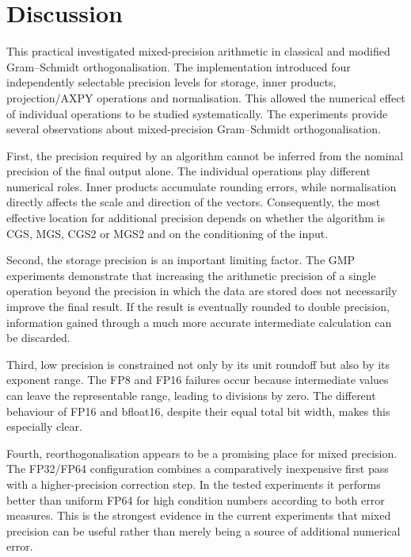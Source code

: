 \documentclass[a4paper,11pt]{article}
\begin{document}
\section{Discussion}

This practical investigated mixed-precision arithmetic in classical and
modified Gram--Schmidt orthogonalisation. The implementation introduced four
independently selectable precision levels for storage, inner products,
projection/AXPY operations and normalisation. This allowed the numerical
effect of individual operations to be studied systematically.
The experiments provide several observations about mixed-precision
Gram--Schmidt orthogonalisation.

First, the precision required by an algorithm cannot be inferred from the
nominal precision of the final output alone. The individual operations play
different numerical roles. Inner products accumulate rounding errors, while
normalisation directly affects the scale and direction of the vectors.
Consequently, the most effective location for additional precision depends on
whether the algorithm is CGS, MGS, CGS2 or MGS2 and on the conditioning of the
input.

Second, the storage precision is an important limiting factor. The GMP
experiments demonstrate that increasing the arithmetic precision of a single
operation beyond the precision in which the data are stored does not
necessarily improve the final result. If the result is eventually rounded to
double precision, information gained through a much more accurate
intermediate calculation can be discarded.

Third, low precision is constrained not only by its unit roundoff but also by
its exponent range. The FP8 and FP16 failures occur because intermediate
values can leave the representable range, leading to divisions by zero. The
different behaviour of FP16 and bfloat16, despite their equal total bit
width, makes this especially clear.

Fourth, reorthogonalisation appears to be a promising place for mixed
precision. The FP32/FP64 configuration combines a comparatively inexpensive
first pass with a higher-precision correction step. In the tested
experiments it performs better than uniform FP64 for high condition numbers
according to both error measures. This is the strongest evidence in the
current experiments that mixed precision can be useful rather than merely
being a source of additional numerical error.
\end{document}
